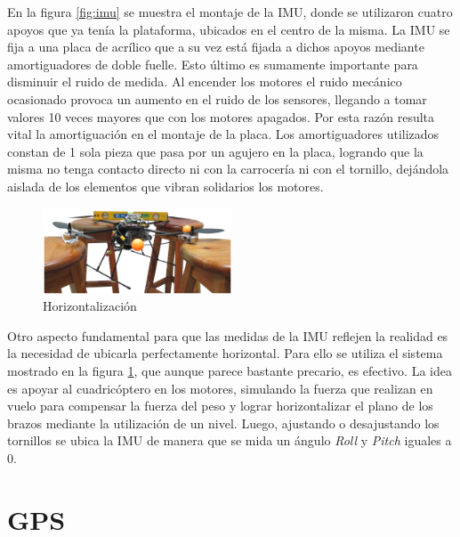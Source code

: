 \documentclass[main]{subfiles}
\begin{document}
En la figura \ref{fig:imu} se muestra el montaje de la IMU, donde se utilizaron cuatro apoyos que ya tenía la plataforma, ubicados en el centro de la misma. La IMU se fija a una placa de acrílico que a su vez está fijada a dichos apoyos mediante amortiguadores de doble fuelle. Esto último es sumamente importante para disminuir el ruido de medida. Al encender los motores el ruido mecánico ocasionado provoca un aumento en el ruido de los sensores, llegando a tomar valores 10 veces mayores que con los motores apagados. Por esta razón resulta vital la amortiguación en el montaje de la placa. Los amortiguadores utilizados constan de 1 sola pieza que pasa por un agujero en la placa, logrando que la misma no tenga contacto directo ni con la carrocería ni con el tornillo, dejándola aislada de los elementos que vibran solidarios los motores.\\

\begin{figure}
	\begin{center}
		\includegraphics[width=0.5\textwidth]{./pics_montaje/horizontalidad.jpg}
	\end{center}
	\caption{Horizontalización}
	\label{fig:horizontalidad}
\end{figure}

Otro aspecto fundamental para que las medidas de la IMU reflejen la realidad es la necesidad de ubicarla perfectamente horizontal. Para ello se utiliza el sistema mostrado en la figura \ref{fig:horizontalidad}, que aunque parece bastante precario, es efectivo. La idea es apoyar al cuadricóptero en los motores, simulando la fuerza que realizan en vuelo para compensar la fuerza del peso y lograr horizontalizar el plano de los brazos mediante la utilización de un nivel. Luego, ajustando o desajustando los tornillos se ubica la IMU de manera que se mida un ángulo \emph{Roll} y \emph{Pitch} iguales a $0$.

\section*{GPS}
\end{document}
